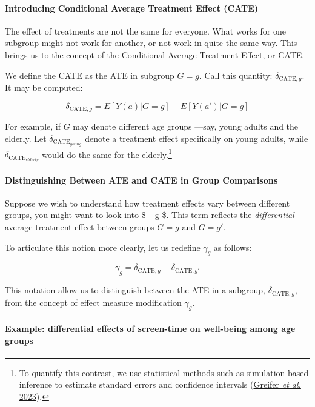 \documentclass[
  singlecolumn]{article}
\let\oldparagraph\paragraph
\renewcommand{\paragraph}[1]{\oldparagraph{#1}\mbox{}}
\begin{document}
\paragraph{Introducing Conditional Average Treatment Effect
(CATE)}\label{introducing-conditional-average-treatment-effect-cate}

The effect of treatments are not the same for everyone. What works for
one subgroup might not work for another, or not work in quite the same
way. This brings us to the concept of the Conditional Average Treatment
Effect, or CATE.

We define the CATE as the ATE in subgroup \(G = g\). Call this quantity:
\(\delta_{\text{CATE},g}\). It may be computed:

\[
\delta_{\text{CATE},g} = E[Y(a)|G=g] - E[Y(a')|G=g]
\]

For example, if \(G\) may denote different age groups ---say, young
adults and the elderly. Let \(\delta_{\text{CATE}_{young}}\) denote a
treatment effect specifically on young adults, while
\(\delta_{\text{CATE}_{elderly}}\) would do the same for the
elderly.\footnote{To quantify this contrast, we use statistical methods
  such as simulation-based inference to estimate standard errors and
  confidence intervals (\hyperref[ref-greifer2023]{Greifer \emph{et al.}
  2023}).}

\paragraph{Distinguishing Between ATE and CATE in Group
Comparisons}\label{distinguishing-between-ate-and-cate-in-group-comparisons}

Suppose we wish to understand how treatment effects vary between
different groups, you might want to look into \$ \gamma\_g \$. This term
reflects the \emph{differential} average treatment effect between groups
\(G = g\) and \(G = g'\).

To articulate this notion more clearly, let us redefine \(\gamma_g\) as
follows:

\[
\gamma_g = \delta_{\text{CATE},g} - \delta_{\text{CATE},g'}
\]

This notation allow us to distinguish between the ATE in a subgroup,
\(\delta_{\text{CATE},g}\), from the concept of effect measure
modification \(\gamma_g\).

\paragraph{Example: differential effects of screen-time on well-being
among age
groups}\label{example-differential-effects-of-screen-time-on-well-being-among-age-groups}
\end{document}
